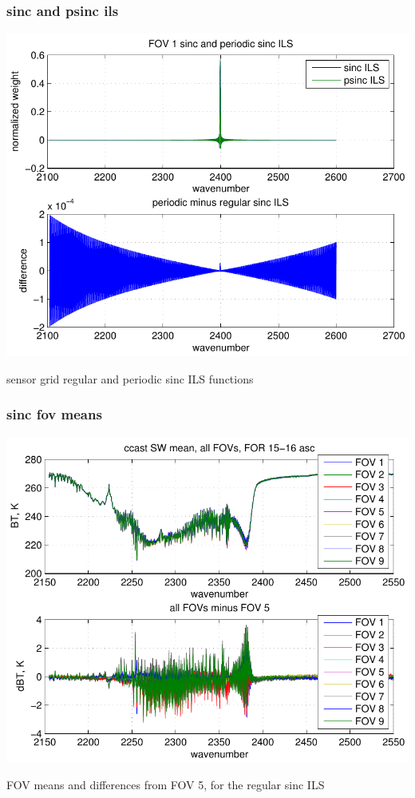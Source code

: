 \documentclass[11pt]{beamer}
\begin{document}
\begin{frame}
\frametitle{sinc and psinc ils}

\begin{center}
  \includegraphics[scale=0.6]{figures/psinc_demo.pdf}
\end{center}

sensor grid regular and periodic sinc ILS functions

\end{frame}
\begin{frame}
\frametitle{sinc fov means}

\begin{center}
  \includegraphics[scale=0.6]{figures/hr2_avg_s.pdf}
\end{center}

FOV means and differences from FOV 5, for the regular sinc ILS

\end{frame}
\end{document}
